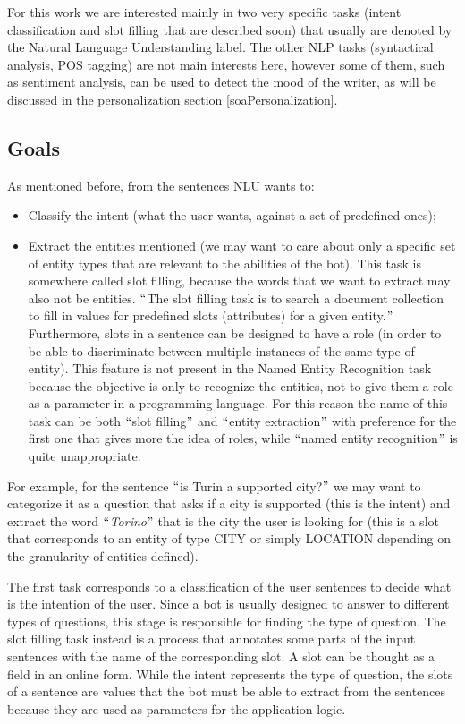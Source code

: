 For this work we are interested mainly in two very specific tasks (intent classification and slot filling that are described soon) that usually are denoted by the Natural Language Understanding label. The other NLP tasks (syntactical analysis, POS tagging) are not main interests here, however some of them, such as sentiment analysis, can be used to detect the mood of the writer, as will be discussed in the personalization section \ref{soaPersonalization}.

\subsection{Goals}
As mentioned before, from the sentences NLU wants to:

\begin{itemize}
	\item Classify the intent (what the user wants, against a set of predefined ones);

	\item Extract the entities mentioned (we may want to care about only a specific set of entity types that are relevant to the abilities of the bot). This task is somewhere called slot filling, because the words that we want to extract may also not be entities. $``$The slot filling task is to search a document collection to fill in values for predefined slots (attributes) for a given entity.$"$  Furthermore, slots in a sentence can be designed to have a role (in order to be able to discriminate between multiple instances of the same type of entity). This feature is not present in the Named Entity Recognition task because the objective is only to recognize the entities, not to give them a role as a parameter in a programming language. For this reason the name of this task can be both $``$slot filling$"$  and $``$entity extraction$"$  with preference for the first one that gives more the idea of roles, while $``$named entity recognition$"$  is quite unappropriate.
\end{itemize}

For example, for the sentence $``$is Turin a supported city?$"$  we may want to categorize it as a question that asks if a city is supported (this is the intent) and extract the word $``$\textit{Torino}$"$  that is the city the user is looking for (this is a slot that corresponds to an entity of type CITY or simply LOCATION depending on the granularity of entities defined).

The first task corresponds to a classification of the user sentences to decide what is the intention of the user. Since a bot is usually designed to answer to different types of questions, this stage is responsible for finding the type of question. The slot filling task instead is a process that annotates some parts of the input sentences with the name of the corresponding slot. A slot can be thought as a field in an online form. While the intent represents the type of question, the slots of a sentence are values that the bot must be able to extract from the sentences because they are used as parameters for the application logic.

